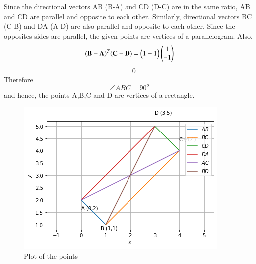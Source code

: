 \documentclass[journal,12pt,twocolumn]{IEEEtran}
\begin{document}
Since the directional vectors AB (B-A) and CD (D-C) are in the same ratio, AB and CD are parallel and opposite to each other. Similarly, directional vectors BC (C-B) and DA (A-D) are also parallel and opposite to each other. Since the opposites sides are parallel, the given points are vertices of a parallelogram.
Also, 
\begin{align}
\mathbf{(B - A)}^T \mathbf{(C - D)} = \begin{pmatrix}1  -1\end{pmatrix} \begin{pmatrix} 1 \\ -1\end{pmatrix}
\end{align}
\begin{align}
= 0
\end{align}
 Therefore $$\angle ABC = 90^o$$ and hence, the points A,B,C and D are vertices of a rectangle.
 
\begin{figure}[!ht]
\centering
\includegraphics[width=\columnwidth]{plot.png}
\caption{Plot of the points}
\label{Plot}
\end{figure}
\end{document}

